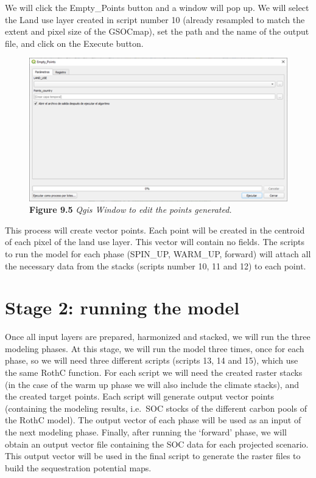 \documentclass[
  10pt,
  b5paper,
]{book}
\begin{document}
We will click the Empty\_Points button and a window will pop up. We will select the Land use layer created in script number 10 (already resampled to match the extent and pixel size of the GSOCmap), set the path and the name of the output file, and click on the Execute button.

\begin{figure}
\centering
\includegraphics{images/Figure_9.5.png}
\caption{\textbf{Figure 9.5} \emph{Qgis Window to edit the points generated.}}
\end{figure}

This process will create vector points. Each point will be created in the centroid of each pixel of the land use layer. This vector will contain no fields. The scripts to run the model for each phase (SPIN\_UP, WARM\_UP, forward) will attach all the necessary data from the stacks (scripts number 10, 11 and 12) to each point.

\hypertarget{stage-2-running-the-model}{%
\chapter{\textbar{} Stage 2: running the model}\label{stage-2-running-the-model}}

Once all input layers are prepared, harmonized and stacked, we will run the three modeling phases. At this stage, we will run the model three times, once for each phase, so we will need three different scripts (scripts 13, 14 and 15), which use the same RothC function. For each script we will need the created raster stacks (in the case of the warm up phase we will also include the climate stacks), and the created target points. Each script will generate output vector points (containing the modeling results, i.e.~SOC stocks of the different carbon pools of the RothC model). The output vector of each phase will be used as an input of the next modeling phase. Finally, after running the `forward' phase, we will obtain an output vector file containing the SOC data for each projected scenario. This output vector will be used in the final script to generate the raster files to build the sequestration potential maps.
\end{document}
